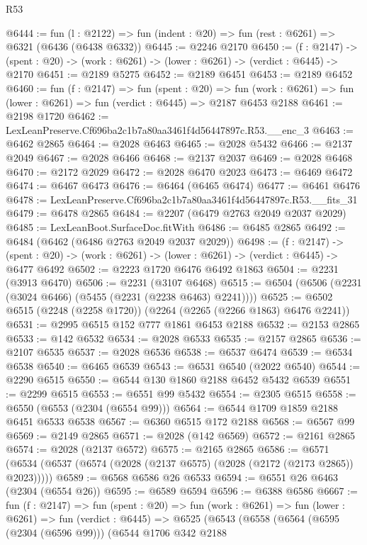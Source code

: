 \begin{lexlean}{R53}
\begin{coremodule}
@6444 := fun (l : @2122) => fun (indent : @20) => fun (rest : @6261) => @6321 (@6436 (@6438 @6332))
@6445 := @2246 @2170
@6450 := (f : @2147) ->
  (spent : @20) -> (work : @6261) -> (lower : @6261) -> (verdict : @6445) -> @2170
@6451 := @2189 @5275
@6452 := @2189 @6451
@6453 := @2189 @6452
@6460 := fun (f : @2147) =>
  fun (spent : @20) =>
  fun (work : @6261) => fun (lower : @6261) => fun (verdict : @6445) => @2187 @6453 @2188
@6461 := @2198 @1720
@6462 := LexLeanPreserve.Cf696ba2c1b7a80aa3461f4d56447897c.R53.__enc_3
@6463 := @6462 @2865
@6464 := @2028 @6463
@6465 := @2028 @5432
@6466 := @2137 @2049
@6467 := @2028 @6466
@6468 := @2137 @2037
@6469 := @2028 @6468
@6470 := @2172 @2029
@6472 := @2028 @6470 @2023
@6473 := @6469 @6472
@6474 := @6467 @6473
@6476 := @6464 (@6465 @6474)
@6477 := @6461 @6476
@6478 := LexLeanPreserve.Cf696ba2c1b7a80aa3461f4d56447897c.R53.__fits_31
@6479 := @6478 @2865
@6484 := @2207 (@6479 @2763 @2049 @2037 @2029)
@6485 := LexLeanBoot.SurfaceDoc.fitWith
@6486 := @6485 @2865
@6492 := @6484 (@6462 (@6486 @2763 @2049 @2037 @2029))
@6498 := (f : @2147) ->
  (spent : @20) -> (work : @6261) -> (lower : @6261) -> (verdict : @6445) -> @6477 @6492
@6502 := @2223 @1720 @6476 @6492 @1863
@6504 := @2231 (@3913 @6470)
@6506 := @2231 (@3107 @6468)
@6515 := @6504 (@6506 (@2231 (@3024 @6466) (@5455 (@2231 (@2238 @6463) @2241))))
@6525 := @6502 @6515 (@2248 (@2258 @1720)) (@2264 (@2265 (@2266 @1863) @6476 @2241))
@6531 := @2995 @6515 @152 @777 @1861 @6453 @2188
@6532 := @2153 @2865
@6533 := @142 @6532
@6534 := @2028 @6533
@6535 := @2157 @2865
@6536 := @2107 @6535
@6537 := @2028 @6536
@6538 := @6537 @6474
@6539 := @6534 @6538
@6540 := @6465 @6539
@6543 := @6531 @6540 (@2022 @6540)
@6544 := @2290 @6515
@6550 := @6544 @130 @1860 @2188 @6452 @5432 @6539
@6551 := @2299 @6515
@6553 := @6551 @99 @5432
@6554 := @2305 @6515
@6558 := @6550 (@6553 (@2304 (@6554 @99)))
@6564 := @6544 @1709 @1859 @2188 @6451 @6533 @6538
@6567 := @6360 @6515 @172 @2188
@6568 := @6567 @99
@6569 := @2149 @2865
@6571 := @2028 (@142 @6569)
@6572 := @2161 @2865
@6574 := @2028 (@2137 @6572)
@6575 := @2165 @2865
@6586 := @6571 (@6534 (@6537 (@6574 (@2028 (@2137 @6575) (@2028 (@2172 (@2173 @2865)) @2023)))))
@6589 := @6568 @6586 @26 @6533
@6594 := @6551 @26 @6463 (@2304 (@6554 @26))
@6595 := @6589 @6594
@6596 := @6388 @6586
@6667 := fun (f : @2147) =>
  fun (spent : @20) =>
  fun (work : @6261) =>
  fun (lower : @6261) =>
  fun (verdict : @6445) =>
  @6525
    (@6543
      (@6558
        (@6564
          (@6595 (@2304 (@6596 @99)))
          (@6544
            @1706
            @342
            @2188

\end{coremodule}
\end{lexlean}
